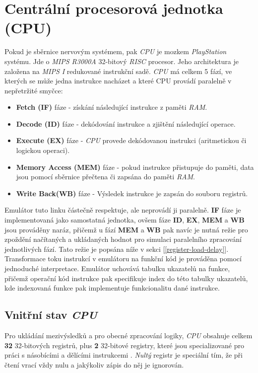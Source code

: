 \section{Centrální procesorová jednotka (CPU)}

Pokud je sběrnice nervovým systémem, pak \textit{CPU} je mozkem \textit{PlayStation} systému. Jde
o \textit{MIPS R3000A} 32-bitový \textit{RISC} procesor. Jeho architektura je založena na \textit{MIPS I} redukované instrukční sadě.
\textit{CPU} má celkem 5 fází, ve kterých se může jedna instrukce nacházet a které CPU provádí paralelně v nepřetržité smyčce:

\begin{itemize}
    \item{\textbf{Fetch (IF)} fáze - získání následující instrukce z paměti \textit{RAM}.}
    \item{\textbf{Decode (ID)} fáze - dekódování instrukce a zjištění následující operace.}
    \item{\textbf{Execute (EX)} fáze - \textit{CPU} provede dekódovanou instrukci (aritmetickou či logickou operaci).}
    \item{\textbf{Memory Access (MEM)} fáze - pokud instrukce přistupuje do paměti, data jsou pomocí sběrnice přečtena či zapsána do paměti \textit{RAM}.}
    \item{\textbf{Write Back(WB)} fáze - Výsledek instrukce je zapsán do souboru registrů.}
\end{itemize}


Emulátor tuto linku částečně respektuje, ale neprovádí ji paralelně. \textbf{IF} fáze je
implementovaná jako samostatná jednotka, ovšem fáze \textbf{ID}, \textbf{EX}, \textbf{MEM} a \textbf{WB}
jsou prováděny naráz, přičemž u fází \textbf{MEM} a \textbf{WB} pak navíc je nutná režie pro
zpoždění načítaných a ukládaných hodnot pro simulaci paralelního zpracování jednotlivých fází. Tato režie je popsána níže v sekci [\ref{register-load-delay}].
Transformace toku instrukcí v emulátoru na funkční kód je prováděna pomocí jednoduché interpretace. Emulátor uchovává tabulku ukazatelů na funkce, přičemž operační kód instrukce pak specifikuje index do této tabulky ukazatelů, kde indexovaná funkce pak implementuje funkcionalitu dané instrukce.

\subsection{Vnitřní stav \textit{CPU}} \label{cpu-state}

Pro ukládání mezivýsledků a pro obecné zpracování logiky, \textit{CPU} obsahuje celkem \textbf{32} 32-bitových registrů, plus \textbf{2} 32-bitové registry, které
jsou specializované pro práci s násobícími a dělícími instrukcemi \cite{MIPSSpec}. 
\textit{Nultý} registr je speciální tím, že při čtení vrací vždy nulu a jakýkoliv zápis do něj je ignorován.

